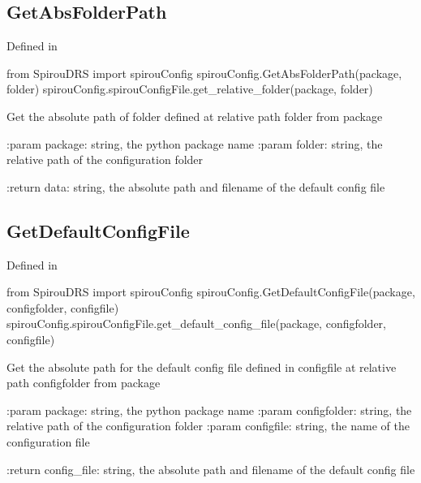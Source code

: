 \noindent\begin{minipage}{\textwidth}
\subsection{GetAbsFolderPath}

Defined in \spirouConfig{}

\begin{pythonbox}
from SpirouDRS import spirouConfig
spirouConfig.GetAbsFolderPath(package, folder)
spirouConfig.spirouConfigFile.get_relative_folder(package, folder)
\end{pythonbox}

\begin{pythondocstring}
Get the absolute path of folder defined at relative path
folder from package

:param package: string, the python package name
:param folder: string, the relative path of the configuration folder

:return data: string, the absolute path and filename of the default config
              file
\end{pythondocstring}
\end{minipage}

\noindent\begin{minipage}{\textwidth}
\subsection{GetDefaultConfigFile}

Defined in \spirouConfig{}

\begin{pythonbox}
from SpirouDRS import spirouConfig
spirouConfig.GetDefaultConfigFile(package, configfolder, configfile)
spirouConfig.spirouConfigFile.get_default_config_file(package, configfolder, configfile)
\end{pythonbox}

\begin{pythondocstring}
Get the absolute path for the  default config file defined in
configfile at relative path configfolder from package

:param package: string, the python package name
:param configfolder: string, the relative path of the configuration folder
:param configfile: string, the name of the configuration file

:return config_file: string, the absolute path and filename of the
                     default config file
\end{pythondocstring}
\end{minipage}

